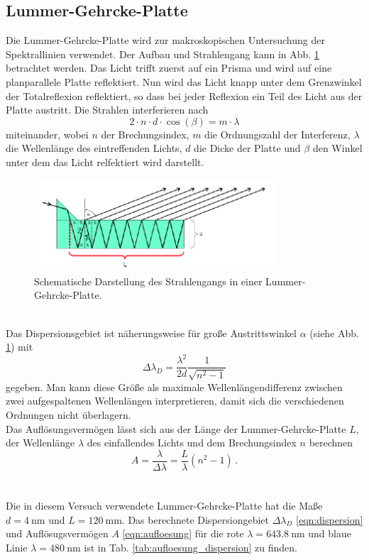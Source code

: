 \subsection{Lummer-Gehrcke-Platte}
Die Lummer-Gehrcke-Platte wird zur makroskopischen Untersuchung der Spektrallinien verwendet.
Der Aufbau und Strahlengang kann in Abb. \ref{fig:lummer} betrachtet werden.
Das Licht trifft zuerst auf ein Prisma und wird auf eine planparallele Platte reflektiert.
Nun wird das Licht knapp unter dem Grenzwinkel der Totalreflexion reflektiert, so dass bei jeder Reflexion ein Teil des Licht aus der Platte austritt.
Die Strahlen interferieren nach
\begin{equation*}
    2 \cdot n \cdot d \cdot \cos (\beta) = m \cdot \lambda
\end{equation*}
miteinander, wobei $n$ der Brechungsindex, $m$ die Ordnungszahl der Interferenz, $\lambda$ die Wellenlänge des eintreffenden Lichts, $d$ die Dicke der Platte und $\beta$ den Winkel unter dem das Licht relfektiert wird darstellt.
\begin{figure}
    \centering
    \includegraphics[width=0.8\textwidth]{content/data/lumer_gehrcke_platte.png}
    \caption{Schematische Darstellung des Strahlengangs in einer Lummer-Gehrcke-Platte.} %
    \label{fig:lummer}
\end{figure}
\\
Das Dispersionsgebiet ist näherungsweise für große Austrittswinkel $\alpha$ (siehe Abb. \ref{fig:lummer}) mit
\begin{equation}
    \Delta \lambda_D = \frac{\lambda^2}{2d} \frac{1}{\sqrt{n^2 -1}}
    \label{eqn:dispersion}
\end{equation}
gegeben.
Man kann diese Größe als maximale Wellenlängendifferenz zwischen zwei aufgespaltenen Wellenlängen interpretieren, damit sich die verschiedenen Ordnungen nicht überlagern.
\\
Das Auflösungsvermögen lässt sich aus der Länge der Lummer-Gehrcke-Platte $L$, der Wellenlänge $\lambda$ des einfallendes Lichts und dem Brechungsindex $n$ berechnen
\begin{equation}
    A = \frac{\lambda}{\Delta \lambda} = \frac{L}{\lambda} (n^2 - 1) \, .
    \label{eqn:aufloesung}
\end{equation}
\\
\\
Die in diesem Versuch verwendete Lummer-Gehrcke-Platte hat die Maße $d=\SI{4}{\nano\metre}$ und $L=\SI{120}{\milli\metre}$.
Das berechnete Dispersiongebiet $\Delta \lambda_D$ \eqref{eqn:dispersion} und Auflösugsvermögen $A$ \eqref{eqn:aufloesung} für die rote $\lambda = \SI{643,8}{\nano\metre}$ und blaue Linie $\lambda = \SI{480}{\nano\metre}$ ist in Tab. \ref{tab:aufloesung_dispersion} zu finden.

